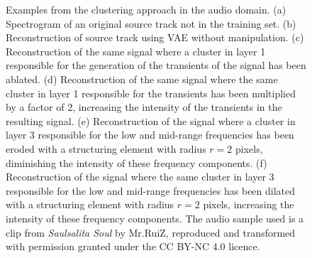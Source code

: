 \begin{figure}[tp!]
   \hfill
    \hfill
   \caption[A comparison of different transforms being applied to different clusters in various layers of the SpectrogramVAE]{Examples from the clustering approach in the audio domain. (a) Spectrogram of an original source track not in the training set. (b) Reconstruction of source track using VAE without manipulation. (c) Reconstruction of the same signal where a cluster in layer 1 responsible for the generation of the transients of the signal has been ablated. (d) Reconstruction of the same signal where the same cluster in layer 1 responsible for the transients has been multiplied by a factor of 2, increasing the intensity of the transients in the resulting signal. (e) Reconstruction of the signal where a cluster in layer 3 responsible for the low and mid-range frequencies has been eroded with a structuring element with radius $r=2$ pixels, diminishing the intensity of these frequency components. (f) Reconstruction of the signal where the same cluster in layer 3 responsible for the low and mid-range frequencies has been dilated with a structuring element with radius $r=2$ pixels, increasing the intensity of these frequency components. The audio sample used is a clip from \textit{Saulsalita Soul} by Mr.RuiZ, reproduced and transformed with permission granted under the CC BY-NC 4.0 licence.}
   \label{fig:c5:cluster_audio_comp}
\end{figure}

